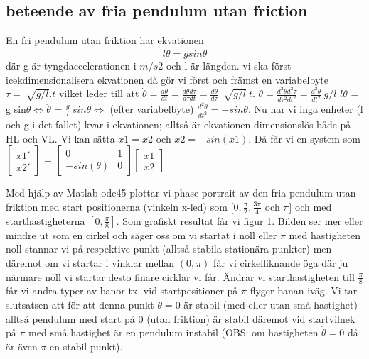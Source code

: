 \documentclass{article}
\begin{document}
\subsection{beteende av fria pendulum utan friction}
En fri pendulum utan friktion har ekvationen 
 \begin{equation} 
l\ddot{\theta} = g sin{\theta} \end{equation} 
där g är tyngdaccelerationen i ${m}/s{2}$ och l är längden.\newline
vi ska först icekdimensionalisera ekvationen då gör vi först och främst en variabelbyte ${\tau} = {\sqrt[]{g/l}}.t$ vilket leder till att $\dot{\theta} = \frac{d{\theta}}{dt} = \frac{d{\theta}d{\tau}}{d{\tau}dt} = \frac{d{\theta}}{d{\tau}}\ {\sqrt[]{g/l}}\ t.$\newline
$\ddot{\theta} = \frac{d^{2}{\theta}d^{2}{\tau}}{d{\tau}^{2}dt^{2}} = \frac{d^{2}{\theta}}{dt^{2}}\ {g/l} $\newline
$l\ddot{\theta}$ = g sin${\theta} \iff \ddot{\theta}$ = $\frac{g}{l}\ sin{\theta} \iff $ (efter variabelbyte) $\frac{d^{2}{\theta}}{dt^{2}} = -sin{\theta}. $ Nu har vi inga enheter (l och g i det fallet) kvar i ekvationen; alltså är ekvationen dimensionslös både på HL och VL. \newline
Vi kan sätta $\dot{x1} = x2$ och $\dot{x2} = -sin(x1). $ Då får vi en system som \newline $ \begin{bmatrix} x1' \\ x2' \end{bmatrix} $ =  $ \begin{bmatrix} 0 & 1 \\ -sin({\theta}) & 0 \end{bmatrix} \begin{bmatrix} x1 \\ x2 \end{bmatrix}$
\bigbreak

Med hjälp av Matlab ode45 plottar vi phase portrait av den fria pendulum utan friktion med start positionerna (vinkeln x-led) som $[0, \frac{\pi}{2}, \frac{3\pi}{4}$ och ${\pi}]$ och med starthastigheterna $[0, \frac{\pi}{8}].$ Som grafiskt resultat får vi figur 1. 
Bilden ser mer eller mindre ut som en cirkel och säger oss om vi startat i noll eller ${\pi}$ med hastigheten noll stannar vi på respektive punkt (alltså stabila stationära punkter) men däremot om vi startar i vinklar mellan $(0, {\pi})$ får vi cirkelliknande öga där ju närmare noll vi startar desto finare cirklar vi får.
Ändrar vi starthastigheten till $\frac{\pi}{8}$ får vi andra typer av banor tx. vid startpositioner på $ {\pi} $ flyger banan iväg.\newline
Vi tar slutsatsen att för att denna punkt ${\theta} = 0$ är stabil (med eller utan små hastighet) alltså pendulum med start på 0 (utan friktion) är stabil däremot vid startvilnek på ${\pi}$ med små hastighet är en pendulum instabil (OBS: om hastigheten $\dot{\theta} = 0$ då är även ${\pi}$ en stabil punkt).
\end{document}
